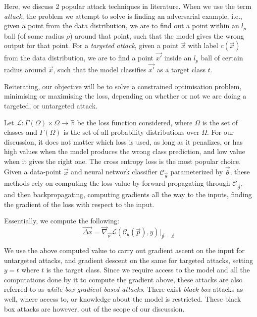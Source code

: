 \documentclass{ociamthesis}
\begin{document}
Here, we discuss 2 popular attack techniques in literature. When we use the term
\emph{attack}, the problem we attempt to solve is finding an adversarial
example, i.e., given a point from the data distribution, we are to find out a
point within an $l_p$ ball (of some radius $\rho$) around that point, such that
the model gives the wrong output for that point. For a \emph{targeted attack},
given a point $\vec{x}$ with label $c(\vec{x})$ from the data distribution, we
are to find a point $\vec{x'}$ inside an $l_p$ ball of certain radius around
$\vec{x}$, such that the model classifies $\vec{x'}$ as a target class $t$.

Reiterating, our objective will be to solve a constrained optimisation problem,
minimising or maximising the loss, depending on whether or not we are doing a
targeted, or untargeted attack.

Let $\mathcal{L}: \Gamma(\Omega) \times \Omega \to \mathbb{R}$ be the loss
function considered, where $\Omega$ is the set of classes and $\Gamma(\Omega)$
is the set of all probability distributions over $\Omega$. For our discussion,
it does not matter which loss is used, as long as it penalizes, or has high
values when the model produces the wrong class prediction, and low value when it
gives the right one. The cross entropy loss is the most popular choice. Given a
data-point $\vec{x}$ and neural network classifier $\mathcal{C}_\vec{\theta}$
parameterized by $\vec{\theta}$, these methods rely on computing the loss value
by forward propagating through $\mathcal{C}_\vec{\theta}$, and then
backpropagating, computing gradients all the way to the inputs, finding the
gradient of the loss with respect to the input.

Essentially, we compute the following:
\begin{equation*}
    \vec{\Delta x}
    = \vec{\nabla}_\vec{p} \mathcal{L}(\mathcal{C}_\theta (\vec{p}), y)
    \bigr \rvert_{\vec{p}=\vec{x}}
\end{equation*}

We use the above computed value to carry out gradient ascent on the input for
untargeted attacks, and gradient descent on the same for targeted attacks,
setting $y=t$ where $t$ is the target class. Since we require access to the
model and all the computations done by it to compute the gradient above, these
attacks are also referred to as \emph{white box gradient based attacks}. There
exist \emph{black box} \citep{simba,genattack,prior-conv} attacks as well, where
access to, or knowledge about the model is restricted. These black box attacks
are however, out of the scope of our discussion.
\end{document}
